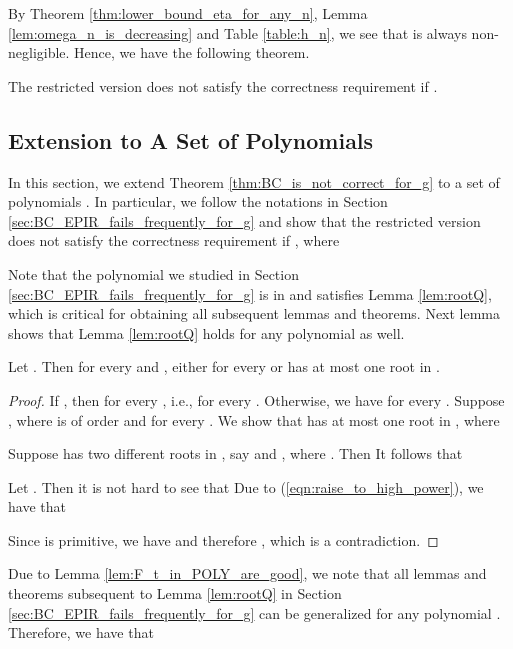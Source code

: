 \documentclass[JMC]{degruyter-journal}
\begin{document}
By Theorem \ref{thm:lower_bound_eta_for_any_n}, Lemma \ref{lem:omega_n_is_decreasing}
and Table \ref{table:h_n},  we see that
 is always non-negligible.
Hence, we have the following theorem.
\begin{theorem}\label{thm:BC_is_not_correct_for_g}
The restricted version  does not satisfy the correctness requirement if .
\end{theorem}





\subsection{Extension to A Set of Polynomials}

In this section, we extend Theorem \ref{thm:BC_is_not_correct_for_g}
to a set of polynomials
 . In particular, we follow the notations in Section \ref{sec:BC_EPIR_fails_frequently_for_g} and
  show that the restricted version   does not satisfy the correctness requirement
if  , where
\begin{center}

\end{center}
Note that the polynomial  we studied in Section
\ref{sec:BC_EPIR_fails_frequently_for_g} is in
 and satisfies Lemma \ref{lem:rootQ}, which is critical
for obtaining all subsequent  lemmas and theorems.
 Next lemma shows that Lemma \ref{lem:rootQ} holds for any polynomial
 as well.
\begin{lemma}\label{lem:F_t_in_POLY_are_good}
Let  . Then for every  and , either  for every
 or  has at most one root in .
\end{lemma}

\begin{proof}
If , then  for every
, i.e.,  for every . Otherwise, we have  for every . Suppose
 , where  is of order  and
  for every . We show that  has at most one root in , where
 
Suppose  has two different roots in , say  and ,
where . Then
 It
follows that

Let . Then it is not hard to see that
 Due to
(\ref{eqn:raise_to_high_power}), we have that

Since  is primitive, we have
 and therefore , which  is a
contradiction.
\end{proof}

Due to Lemma \ref{lem:F_t_in_POLY_are_good}, we note that all lemmas
and theorems subsequent to Lemma \ref{lem:rootQ} in Section
\ref{sec:BC_EPIR_fails_frequently_for_g} can be generalized  for any
polynomial . Therefore, we have that
\end{document}
